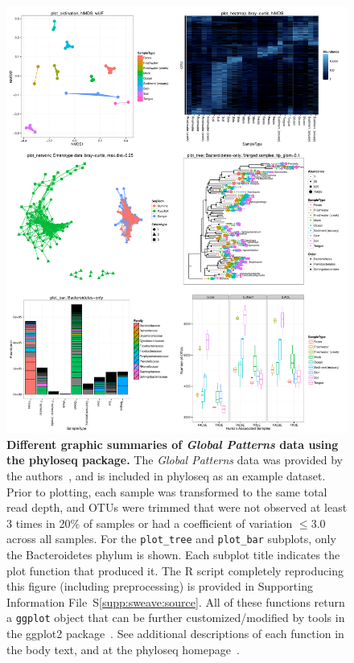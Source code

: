 \documentclass[10pt]{article}\usepackage{graphicx, color}
\newcommand{\R}{{\textsf{R}}}
\newcommand{\code}[1]{{\texttt{#1}}}
\begin{document}
\begin{figure}[!htbp]
\begin{center}
\includegraphics[width=\textwidth]{submit-main/phyloseq-plot-main.pdf}
\end{center}
\caption{
{\bf Different graphic summaries of \emph{Global Patterns} data
using the phyloseq package.}
The \emph{Global Patterns} data was provided by the authors~\cite{globalpatterns},
and is included in phyloseq as an example dataset.
Prior to plotting,
each sample was transformed to the same total read depth, 
and OTUs were trimmed that were not observed at least 3 times in 20\% of samples or had a coefficient of variation $\leq{}3.0$ across all samples. 
For the \code{plot{\_}tree} and \code{plot{\_}bar} subplots,
only the Bacteroidetes phylum is shown.
Each subplot title indicates the plot function that produced it.
The \R{} script completely reproducing this figure 
(including preprocessing)
is provided in Supporting Information File~S\ref{supp:sweave:source}.
All of these functions return a \code{ggplot} object
that can be further customized/modified
by tools in the ggplot2 package~\cite{ggplot2}.
See additional descriptions of each function in the body text,
and at the phyloseq homepage~\cite{phyloseq:github}.
}
\label{fig:phyloseqPlot}
\end{figure}
\end{document}
